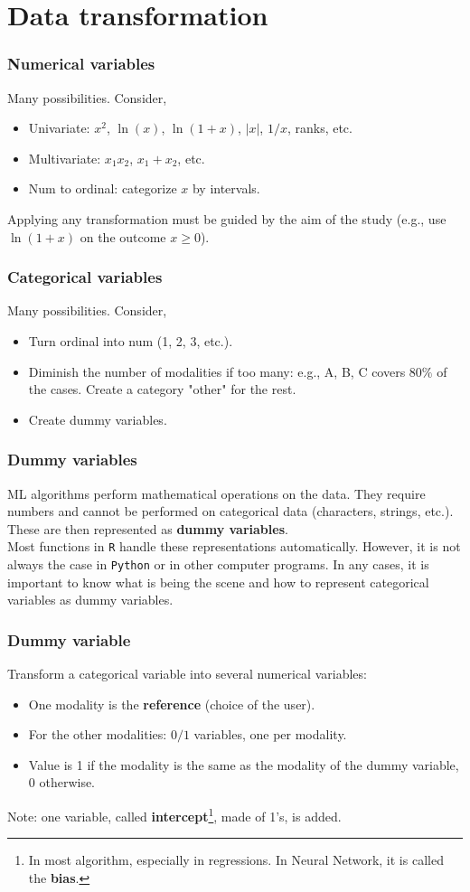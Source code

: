 \section{Data transformation}
\begin{frame}
\frametitle{Numerical variables}
Many possibilities. Consider,
\begin{itemize}
\item Univariate: $x^2$, $\ln(x)$, $\ln(1+x)$, $|x|$, $1/x$, ranks, etc.
\item Multivariate: $x_1 x_2$, $x_1 + x_2$, etc.
\item Num to ordinal: categorize $x$ by intervals.
\end{itemize}
Applying any transformation must be guided by the aim of the study (e.g., use $\ln(1+x)$ on the outcome $x\geq 0$). 
\end{frame}
\begin{frame}
\frametitle{Categorical variables}
Many possibilities. Consider,
\begin{itemize}
\item Turn ordinal into num (1, 2, 3, etc.).
\item Diminish the number of modalities if too many: e.g., A, B, C covers $80\%$ of the cases. Create a category "other" for the rest.
\item Create dummy variables.
\end{itemize}
\end{frame}
\begin{frame}
\frametitle{Dummy variables}
ML algorithms perform mathematical operations on the data. They require numbers and cannot be performed on categorical data (characters, strings, etc.). These are then represented as {\bf dummy variables}. \\
\vspace{0.3cm}
Most functions in {\tt R} handle these representations automatically. However, it is not always the case in {\tt Python} or in other computer programs. In any cases, it is important to know what is being the scene and how to represent categorical variables as dummy variables.
\end{frame}
\begin{frame}
\frametitle{Dummy variable}
Transform a categorical variable into several numerical variables:
\begin{itemize}
\item One modality is the {\bf reference} (choice of the user).
\item For the other modalities: $0/1$ variables, one per modality. 
\item Value is 1 if the modality is the same as the modality of the dummy variable, 0 otherwise.
\end{itemize}
Note: one variable, called {\bf intercept}\footnote{In most algorithm, especially in regressions. In Neural Network, it is called the {\bf bias}.}, made of 1's, is added.
\end{frame}
